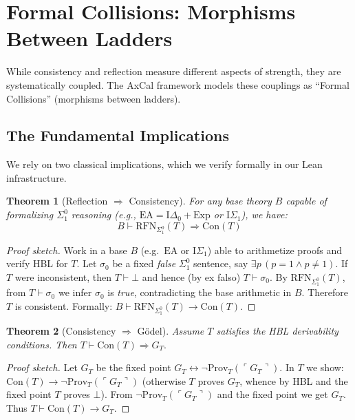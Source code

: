 \documentclass[11pt]{article}
\newtheorem{theorem}{Theorem}[section]
\newcommand{\EA}{\mathrm{EA}}
\newcommand{\ISigma}{\mathrm{I}\Sigma_1}
\newcommand{\Con}{\mathrm{Con}}
\newcommand{\RFNSigOne}{\mathrm{RFN}_{\Sigma^0_1}}
\newcommand{\Prov}{\mathrm{Prov}}
\begin{document}
\section{Formal Collisions: Morphisms Between Ladders}

While consistency and reflection measure different aspects of strength, they are systematically coupled. The AxCal framework models these couplings as ``Formal Collisions'' (morphisms between ladders).

\subsection{The Fundamental Implications}
We rely on two classical implications, which we verify formally in our Lean infrastructure.

\begin{theorem}[Reflection $\Rightarrow$ Consistency]\label{thm:RFN-implies-Con}
For any base theory $B$ capable of formalizing $\Sigma^0_1$ reasoning (e.g., $\EA = \mathrm{I}\Delta_0 + \mathrm{Exp}$ or $\ISigma$), we have:
$$B \vdash \RFNSigOne(T) \Rightarrow \Con(T)$$
\end{theorem}
\begin{proof}[Proof sketch]
Work in a base $B$ (e.g.\ $\EA$ or $\ISigma$) able to arithmetize proofs and verify HBL for $T$.
Let $\sigma_0$ be a fixed \emph{false} $\Sigma^0_1$ sentence, say $\exists p\,(p=1\wedge p\neq 1)$.
If $T$ were inconsistent, then $T\vdash \bot$ and hence (by ex falso) $T\vdash \sigma_0$.
By $\RFNSigOne(T)$, from $T\vdash \sigma_0$ we infer $\sigma_0$ is \emph{true}, contradicting the
base arithmetic in $B$. Therefore $T$ is consistent. Formally: $B\vdash \RFNSigOne(T)\to\Con(T)$.
\end{proof}

\begin{theorem}[Consistency $\Rightarrow$ Gödel]\label{thm:Con-implies-G}
Assume $T$ satisfies the HBL derivability conditions. Then
$T \vdash \Con(T) \Rightarrow G_T.$
\end{theorem}

\begin{proof}[Proof sketch]
Let $G_T$ be the fixed point $G_T \leftrightarrow \neg \Prov_T(\ulcorner G_T\urcorner)$.
In $T$ we show: $\Con(T)\to \neg \Prov_T(\ulcorner G_T\urcorner)$ (otherwise $T$ proves $G_T$,
whence by HBL and the fixed point $T$ proves $\bot$). From $\neg \Prov_T(\ulcorner G_T\urcorner)$
and the fixed point we get $G_T$. Thus $T\vdash \Con(T)\to G_T$.
\end{proof}
\end{document}
